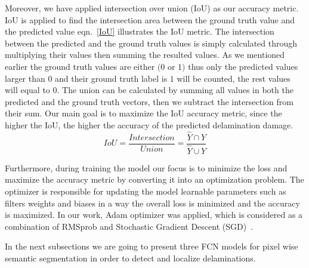 \documentclass[preprint,9pt]{elsarticle}
\begin{document}
	Moreover, we have applied intersection over union (IoU) as our accuracy metric. 
	IoU is applied to find the intersection area between the ground truth value and the predicted value eqn.~\ref{IoU} illustrates the IoU metric.
	The intersection between the predicted and the ground truth values is simply calculated through multiplying their values then summing the resulted values.
	As we mentioned earlier the ground truth values are either \((0\) or \(1)\) thus only the predicted values larger than \(0\) and their ground truth label is \(1\) will be counted, the rest values will equal to \(0\). 
	The union can be calculated by summing all values in both the predicted and the ground truth  vectors, then we subtract the intersection from their sum.
	Our main goal is to maximize the IoU accuracy metric, since the higher the IoU, the higher the accuracy of the predicted delamination damage.
	\begin{equation}
	IoU = \frac{Intersection}{Union} = \frac{\hat{Y} \cap Y}{\hat{Y} \cup Y} 
	\label{IoU}
	\end{equation}

	Furthermore, during training the model our focus is to minimize the loss and maximize the accuracy metric by converting it into an optimization problem. 
	The optimizer is responsible for updating the model learnable parameters such as filters weights and biases in a way the overall loss is minimized and the accuracy is maximized.
	In our work, Adam optimizer was applied, which is considered as a combination of RMSprob and Stochastic Gradient Descent (SGD)~\cite{Kingma2015}. 

	In the next subsections we are going to present three FCN models for pixel wise semantic segmentation in order to detect and localize delaminations.
\end{document}
